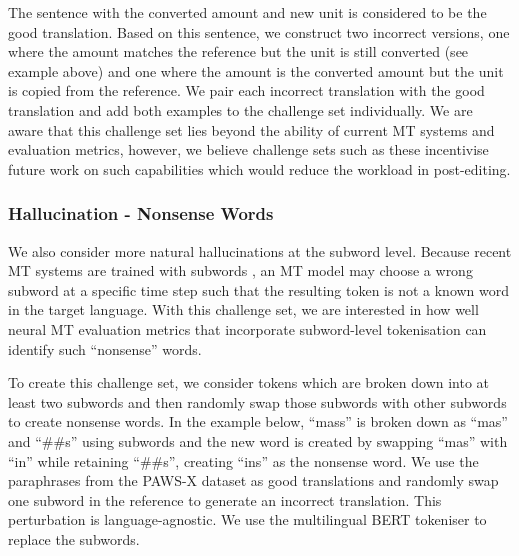 \documentclass[11pt]{article}
\begin{document}
The sentence with the converted amount and new unit is considered to be the good translation. Based on this sentence, we construct two incorrect versions, one where the amount matches the reference but the unit is still converted (see example above) and one where the amount is the converted amount but the unit is copied from the reference. We pair each incorrect translation with the good translation and add both examples to the challenge set individually. We are aware that this challenge set lies beyond the ability of current MT systems and evaluation metrics, however, we believe challenge sets such as these incentivise future work on such capabilities which would reduce the workload in post-editing.


\subsubsection{Hallucination - Nonsense Words}
\label{sec:nonsense}
We also consider more natural hallucinations at the subword level. Because recent MT systems are trained with subwords \citep{sennrich-etal-2016-neural}, an MT model may choose a wrong subword at a specific time step such that the resulting token is not a known word in the target language. With this challenge set, we are interested in how well neural MT evaluation metrics that incorporate subword-level tokenisation can identify such ``nonsense'' words.

To create this challenge set, we consider tokens which are broken down into at least two subwords and then randomly swap those subwords with other subwords to create nonsense words. In the example below, ``mass'' is broken down as ``mas'' and ``\#\#s'' using subwords and the new word is created by swapping ``mas'' with ``in'' while retaining ``\#\#s'', creating ``ins'' as the nonsense word. We use the paraphrases from the PAWS-X dataset as good translations and randomly swap one subword in the reference to generate an incorrect translation. This perturbation is language-agnostic. We use the multilingual BERT \citep{devlin-etal-2019-bert} tokeniser to replace the subwords. 
\end{document}
